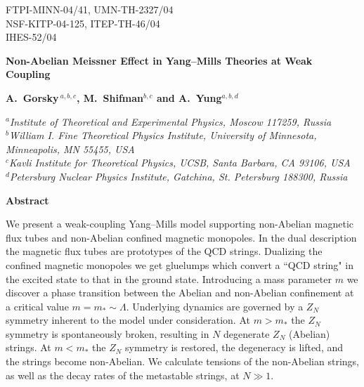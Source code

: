 \vfill

\begin{titlepage}

\begin{flushright}
FTPI-MINN-04/41, UMN-TH-2327/04\\
NSF-KITP-04-125, ITEP-TH-46/04\\
IHES-52/04
\end{flushright}

\begin{center}

{ \Large \bf   Non-Abelian Meissner Effect in Yang--Mills Theories
at Weak Coupling}
\end{center}

\begin{center}
 { \bf A.~Gorsky\,$^{a,b,c}$,
 \bf    M.~Shifman$^{b,c}$ and \bf A.~Yung$^{a,b,d}$}
\end {center}
\vspace{0.3cm}
\begin{center}
$^a${\it Institute of Theoretical and Experimental Physics, Moscow
117259, Russia}\\
$^b${\it  William I. Fine Theoretical Physics Institute,
University of Minnesota,
Minneapolis, MN 55455, USA}\\
$^{c}${\it  Kavli Institute for Theoretical Physics,
 UCSB, Santa Barbara, CA 93106, USA}\\
$^{d}${\it Petersburg Nuclear Physics Institute, Gatchina, St. Petersburg 188300, Russia}
\end{center}

\vspace*{.45cm}
\begin{center}
{\large\bf Abstract}
\end{center}
\vspace*{.05cm}
We present a weak-coupling 
Yang--Mills model supporting non-Abelian 
magnetic flux tubes and non-Abelian confined magnetic monopoles.
In the dual description the magnetic flux tubes are prototypes
of the QCD strings. Dualizing the confined magnetic monopoles
we get gluelumps which convert a ``QCD string" in the excited state
to that in the ground state. Introducing a mass parameter $m$
we discover a phase transition between the Abelian and non-Abelian confinement 
at a critical value $m=m_*\sim \Lambda$. Underlying dynamics are 
governed by a $Z_N$ symmetry inherent to the model under consideration.
At $m>m_*$ the $Z_N$ symmetry is spontaneously broken,
resulting in $N$ degenerate $Z_N$ (Abelian) strings. At $m<m_*$ the $Z_N$ 
symmetry is restored, the degeneracy is lifted, and the strings 
become non-Abelian. We calculate tensions of the non-Abelian
strings, as well as the decay rates of the metastable strings,
at $N\gg 1$.



\end{titlepage}

